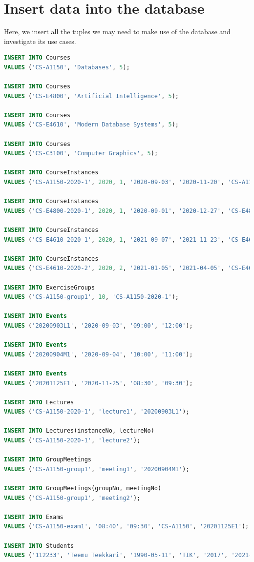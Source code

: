 \documentclass{article}
\begin{document}
\section{Insert data into the database}\label{sec:insert}
Here, we insert all the tuples we may need to make use of the database and investigate its use cases.
\begin{lstlisting}[language=SQL]
INSERT INTO Courses
VALUES ('CS-A1150', 'Databases', 5);

INSERT INTO Courses
VALUES ('CS-E4800', 'Artificial Intelligence', 5);

INSERT INTO Courses
VALUES ('CS-E4610', 'Modern Database Systems', 5);

INSERT INTO Courses
VALUES ('CS-C3100', 'Computer Graphics', 5);

INSERT INTO CourseInstances
VALUES ('CS-A1150-2020-1', 2020, 1, '2020-09-03', '2020-11-20', 'CS-A1150');

INSERT INTO CourseInstances
VALUES ('CS-E4800-2020-1', 2020, 1, '2020-09-01', '2020-12-27', 'CS-E4800');

INSERT INTO CourseInstances
VALUES ('CS-E4610-2020-1', 2020, 1, '2021-09-07', '2021-11-23', 'CS-E4610');

INSERT INTO CourseInstances
VALUES ('CS-E4610-2020-2', 2020, 2, '2021-01-05', '2021-04-05', 'CS-E4610');

INSERT INTO ExerciseGroups
VALUES ('CS-A1150-group1', 10, 'CS-A1150-2020-1');

INSERT INTO Events
VALUES ('20200903L1', '2020-09-03', '09:00', '12:00');

INSERT INTO Events
VALUES ('20200904M1', '2020-09-04', '10:00', '11:00');

INSERT INTO Events
VALUES ('20201125E1', '2020-11-25', '08:30', '09:30');

INSERT INTO Lectures
VALUES ('CS-A1150-2020-1', 'lecture1', '20200903L1');

INSERT INTO Lectures(instanceNo, lectureNo)
VALUES ('CS-A1150-2020-1', 'lecture2');

INSERT INTO GroupMeetings
VALUES ('CS-A1150-group1', 'meeting1', '20200904M1');

INSERT INTO GroupMeetings(groupNo, meetingNo)
VALUES ('CS-A1150-group1', 'meeting2');

INSERT INTO Exams
VALUES ('CS-A1150-exam1', '08:40', '09:30', 'CS-A1150', '20201125E1');

INSERT INTO Students
VALUES ('112233', 'Teemu Teekkari', '1990-05-11', 'TIK', '2017', '2021-08-30');


\end{lstlisting}
\end{document}
